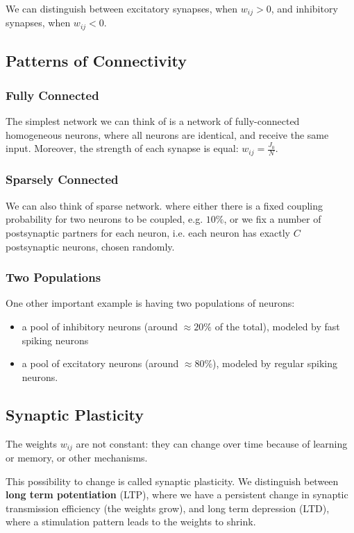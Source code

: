 \documentclass[oneside]{book}
\theoremstyle{definition}
\theoremstyle{plain}
\begin{document}
We can distinguish between excitatory synapses, when $w_{ij}>0$, and inhibitory synapses, when $w_{ij}<0$.
\subsection{Patterns of Connectivity}
\subsubsection*{Fully Connected}
The simplest network we can think of is a network of fully-connected homogeneous neurons, where all neurons are identical, and receive the same input. Moreover, the strength of each synapse is equal: $w_{ij}=   \frac{J_0}{N}$.
\subsubsection*{Sparsely Connected}
We can also think of sparse network. where either there is a fixed coupling probability for two neurons to be coupled, e.g. $10\%$, or we fix a number of postsynaptic partners for each neuron, i.e. each neuron has exactly $C$ postsynaptic neurons, chosen randomly.
\subsubsection*{Two Populations}
One other important example is having two populations of neurons:
\begin{itemize}
    \item a pool of inhibitory neurons (around $\approx 20\%$ of the total), modeled by fast spiking neurons
    \item a pool of excitatory neurons (around $\approx 80\%$), modeled by regular spiking neurons.
\end{itemize}

\subsection{Synaptic Plasticity}

The weights $w_{ij}$ are not constant: they can change over time because of learning or memory, or other mechanisms.

This possibility to change is called synaptic plasticity. We distinguish between \textbf{long term potentiation} (LTP), where we have a persistent change in synaptic transmission efficiency (the weights grow), and long term depression (LTD), where a stimulation pattern leads to the weights to shrink.
\end{document}
